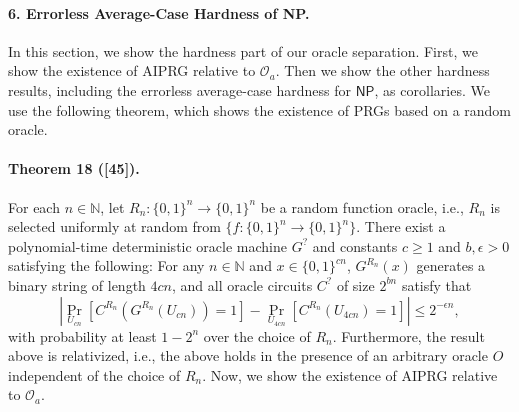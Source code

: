 \paragraph{6. Errorless Average-Case Hardness of NP.}
In this section, we show the hardness part of our oracle separation. First, we show the existence of AIPRG relative to $\mathcal O_a$. Then we show the other hardness results, including the errorless average-case hardness for $\mathsf{NP}$, as corollaries.
We use the following theorem, which shows the existence of PRGs based on a random oracle.
\paragraph{Theorem 18 ([45]).}
For each $n\in\mathbb N$, let $R_n:\{0,1\}^n\to\{0,1\}^n$ be a random function oracle, i.e., $R_n$ is selected uniformly at random from $\{f:\{0,1\}^n\to\{0,1\}^n\}$.
There exist a polynomial-time deterministic oracle machine $G^?$ and constants $c\geq1$ and $b,\epsilon>0$ satisfying the following: For any $n\in\mathbb N$ and $x\in\{0,1\}^{cn}$, $G^{R_n}(x)$ generates a binary string of length $4cn$, and all oracle circuits $C^?$ of size $2^{bn}$ satisfy that
\[\left|\Pr_{U_{cn}}[C^{R_n}(G^{R_n}(U_{cn}))=1]-\Pr_{U_{4cn}}[C^{R_n}(U_{4cn})=1]\right|\leq2^{-\epsilon n},\]
with probability at least $1-2^n$ over the choice of $R_n$.
Furthermore, the result above is relativized, i.e., the above holds in the presence of an arbitrary oracle $O$ independent of the choice of $R_n$.
Now, we show the existence of AIPRG relative to $\mathcal O_a$.
